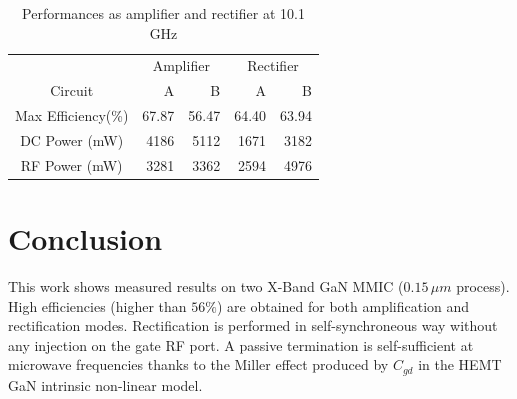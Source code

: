 \documentclass[conference]{IEEEtran}
\begin{document}
\begin{table}[ht]
\caption{Performances as amplifier and rectifier at 10.1 GHz} %
\centering %
\begin{tabular}{c| rr | rr  } %
\hline\hline %
 &\multicolumn{2}{c}{Amplifier} & \multicolumn{2}{c}{Rectifier}\\
Circuit &A&B&A&B\\ [0.25ex]
\hline
Max Efficiency(\%) & 67.87 & 56.47 & 64.40 & 63.94 \\
DC Power (mW) & 4186 & 5112 & 1671 & 3182\\
 RF Power (mW) & 3281 & 3362 & 2594 & 4976\\
\hline\hline
\end{tabular}
\label{tab:hresult}
\end{table}


\section{Conclusion}
This work shows measured results on two X-Band GaN MMIC ($0.15\,\mu m$ process). High efficiencies (higher than $56\%$) are obtained for both amplification and rectification modes. Rectification is performed in self-synchroneous way without any injection on the gate RF port. A passive termination is self-sufficient at microwave frequencies thanks to the Miller effect produced by $C_{gd}$ in the HEMT GaN intrinsic non-linear model.


\end{document}
